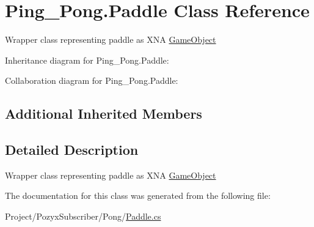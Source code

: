 \hypertarget{class_ping___pong_1_1_paddle}{}\section{Ping\+\_\+\+Pong.\+Paddle Class Reference}
\label{class_ping___pong_1_1_paddle}


Wrapper class representing paddle as X\+NA \hyperlink{class_ping___pong_1_1_game_object}{Game\+Object}  




Inheritance diagram for Ping\+\_\+\+Pong.\+Paddle\+:


Collaboration diagram for Ping\+\_\+\+Pong.\+Paddle\+:
\subsection*{Additional Inherited Members}


\subsection{Detailed Description}
Wrapper class representing paddle as X\+NA \hyperlink{class_ping___pong_1_1_game_object}{Game\+Object} 



The documentation for this class was generated from the following file\+:\begin{DoxyCompactItemize}
\item 
Project/\+Pozyx\+Subscriber/\+Pong/\hyperlink{_paddle_8cs}{Paddle.\+cs}\end{DoxyCompactItemize}
